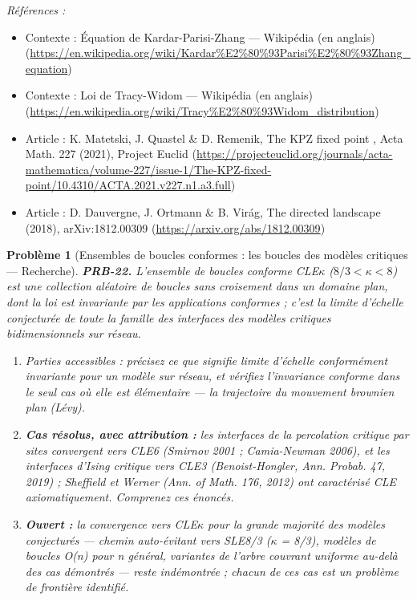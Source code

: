 \documentclass[11pt]{article}
\newtheorem{problem}{Problème}
\newenvironment{refs}{\par\small\noindent\emph{Références :}\begin{itemize}\setlength\itemsep{0pt}}{\end{itemize}\normalsize}
\begin{document}
\begin{refs}
\item Contexte : Équation de Kardar-Parisi-Zhang --- Wikipédia (en anglais) (\url{https://en.wikipedia.org/wiki/Kardar%E2%80%93Parisi%E2%80%93Zhang_equation})
\item Contexte : Loi de Tracy-Widom --- Wikipédia (en anglais) (\url{https://en.wikipedia.org/wiki/Tracy%E2%80%93Widom_distribution})
\item Article : K. Matetski, J. Quastel \& D. Remenik, \og{} The KPZ fixed point \fg{}, Acta Math. 227 (2021), Project Euclid (\url{https://projecteuclid.org/journals/acta-mathematica/volume-227/issue-1/The-KPZ-fixed-point/10.4310/ACTA.2021.v227.n1.a3.full})
\item Article : D. Dauvergne, J. Ortmann \& B. Virág, \og{} The directed landscape \fg{} (2018), arXiv:1812.00309 (\url{https://arxiv.org/abs/1812.00309})
\end{refs}

\bigskip

\begin{problem}[{Ensembles de boucles conformes : les boucles des modèles critiques --- Recherche}]
\textbf{PRB-22.} L'ensemble de boucles conforme CLE$\kappa$
($ 8/3 < \kappa < 8 $) est une collection aléatoire de boucles sans croisement dans un
domaine plan, dont la loi est invariante par les applications conformes ; c'est la limite d'échelle
conjecturée de toute la famille des interfaces des modèles critiques bidimensionnels sur
réseau.
\begin{enumerate}
\item[(i)] Parties accessibles : précisez ce que signifie \og{} limite d'échelle conformément invariante \fg{}
pour un modèle sur réseau, et vérifiez l'invariance conforme dans le seul cas où elle est
élémentaire --- la trajectoire du mouvement brownien plan (Lévy).
\item[(ii)] \textbf{Cas résolus, avec attribution :} les interfaces de la percolation critique par sites
convergent vers CLE6 (Smirnov 2001 ; Camia-Newman 2006), et les interfaces d'Ising
critique vers CLE3 (Benoist-Hongler, Ann. Probab. 47, 2019) ; Sheffield et Werner
(Ann. of Math. 176, 2012) ont caractérisé CLE axiomatiquement. Comprenez ces énoncés.
\item[(iii)] \textbf{Ouvert :} la convergence vers CLE$\kappa$ pour la grande majorité des modèles
conjecturés --- chemin auto-évitant vers SLE8/3 ($\kappa$ = 8/3), modèles de boucles O(n) pour
n général, variantes de l'arbre couvrant uniforme au-delà des cas démontrés --- reste indémontrée ;
chacun de ces cas est un problème de frontière identifié.
\end{enumerate}

\end{problem}
\end{document}
